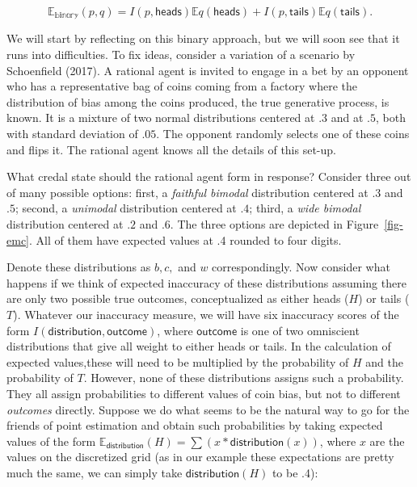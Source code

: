 \documentclass[
  letterpaper,
  DIV=11,
  numbers=noendperiod]{scrartcl}
\begin{document}
\[\mathbb{E_{binary}}(p,q) = I(p,\mathsf{heads}) \mathbb{E}q(\mathsf{heads}) + I(p,\mathsf{tails}) \mathbb{E}q(\mathsf{tails}).\]

We will start by reflecting on this binary approach, but we will soon
see that it runs into difficulties. To fix ideas, consider a variation
of a scenario by Schoenfield (2017). A rational agent is invited to
engage in a bet by an opponent who has a representative bag of coins
coming from a factory where the distribution of bias among the coins
produced, the true generative process, is known. It is a mixture of two
normal distributions centered at \(.3\) and at \(.5\), both with
standard deviation of \(.05\). The opponent randomly selects one of
these coins and flips it. The rational agent knows all the details of
this set-up.

What credal state should the rational agent form in response? Consider
three out of many possible options: first, a \emph{faithful bimodal}
distribution centered at \(.3\) and \(.5\); second, a \emph{unimodal}
distribution centered at \(.4\); third, a \emph{wide bimodal}
distribution centered at \(.2\) and \(.6\). The three options are
depicted in Figure~\ref{fig-emc}. All of them have expected values at .4
rounded to four digits.

Denote these distributions as \(b, c,\) and \(w\) correspondingly. Now
consider what happens if we think of expected inaccuracy of these
distributions assuming there are only two possible true outcomes,
conceptualized as either heads (\(H\)) or tails (\(T\)). Whatever our
inaccuracy measure, we will have six inaccuracy scores of the form
\(I(\mathsf{distribution}, \mathsf{outcome})\), where
\(\mathsf{outcome}\) is one of two omniscient distributions that give
all weight to either heads or tails. In the calculation of expected
values,these will need to be multiplied by the probability of \(H\) and
the probability of \(T\). However, none of these distributions assigns
such a probability. They all assign probabilities to different values of
coin bias, but not to different \emph{outcomes} directly. Suppose we do
what seems to be the natural way to go for the friends of point
estimation and obtain such probabilities by taking expected values of
the form
\(\mathbb{E}_{\mathsf{distribution}}(H) = \sum (x * \mathsf{distribution}(x))\),
where \(x\) are the values on the discretized grid (as in our example
these expectations are pretty much the same, we can simply take
\(\mathsf{distribution}(H)\) to be .4):
\end{document}
